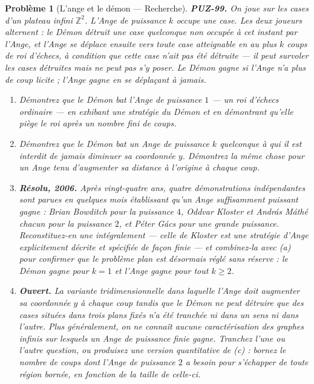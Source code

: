 \documentclass[11pt]{article}
\newtheorem{problem}{Problème}
\begin{document}
\begin{problem}[{L'ange et le démon --- Recherche}]
\textbf{PUZ-99.} On joue sur les cases d'un plateau infini $ \mathbb{Z}^{2} $. L'Ange de
puissance $ k $ occupe une case. Les deux joueurs alternent : le Démon détruit une case
quelconque non occupée à cet instant par l'Ange, et l'Ange se déplace ensuite vers toute case
atteignable en au plus $ k $ coups de roi d'échecs, à condition que cette case n'ait pas été
détruite --- il peut survoler les cases détruites mais ne peut pas s'y poser. Le Démon gagne si
l'Ange n'a plus de coup licite ; l'Ange gagne en se déplaçant à jamais.
\begin{enumerate}
\item[(a)] Démontrez que le Démon bat l'Ange de puissance $ 1 $ --- un roi d'échecs ordinaire --- en
exhibant une stratégie du Démon et en démontrant qu'elle piège le roi après un nombre fini de
coups.
\item[(b)] Démontrez que le Démon bat un Ange de puissance $ k $ quelconque à qui il est interdit
de jamais diminuer sa coordonnée $ y $. Démontrez la même chose pour un Ange tenu d'augmenter sa
distance à l'origine à chaque coup.
\item[(c)] \textbf{Résolu, 2006.} Après vingt-quatre ans, quatre démonstrations indépendantes sont
parues en quelques mois établissant qu'un Ange suffisamment puissant gagne : Brian Bowditch
pour la puissance $ 4 $, Oddvar Kloster et András Máthé chacun pour la puissance $ 2 $, et
Péter Gács pour une grande puissance. Reconstituez-en une intégralement --- celle de Kloster est
une stratégie d'Ange explicitement décrite et spécifiée de façon finie --- et combinez-la avec
(a) pour confirmer que le problème plan est désormais réglé sans réserve : le Démon gagne pour
$ k = 1 $ et l'Ange gagne pour tout $ k \ge 2 $.
\item[(d)] \textbf{Ouvert.} La variante tridimensionnelle dans laquelle l'Ange doit augmenter sa coordonnée
$ y $ à chaque coup tandis que le Démon ne peut détruire que des cases situées dans trois
plans fixés n'a été tranchée ni dans un sens ni dans l'autre. Plus généralement, on ne connaît
aucune caractérisation des graphes infinis sur lesquels un Ange de puissance finie gagne.
Tranchez l'une ou l'autre question, ou produisez une version quantitative de (c) : bornez le
nombre de coups dont l'Ange de puissance $ 2 $ a besoin pour s'échapper de toute région
bornée, en fonction de la taille de celle-ci.
\end{enumerate}

\end{problem}
\end{document}
